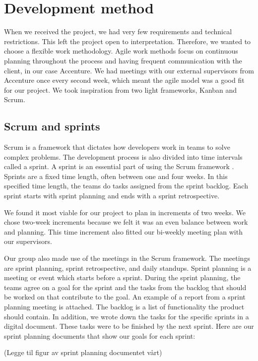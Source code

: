 
\section{Development method}
When we received the project, we had very few requirements and technical restrictions. This left the project open to interpretation. Therefore, we wanted to choose a flexible work methodology. Agile work methods focus on continuous planning throughout the process and having frequent communication with the client, in our case Accenture. We had meetings with our external supervisors from Accenture once every second week, which meant the agile model was a good fit for our project. We took inspiration from two light frameworks, Kanban and Scrum.

\subsection{Scrum and sprints}
Scrum is a framework that dictates how developers work in teams to solve complex problems. The development process is also divided into time intervals called a sprint. A sprint is an essential part of using the Scrum framework \parencite{prosjektveilederen}. Sprints are a fixed time length, often between one and four weeks. In this specified time length, the teams do tasks assigned from the sprint backlog. Each sprint starts with sprint planning and ends with a sprint retrospective.

We found it most viable for our project to plan in increments of two weeks. We chose two-week increments because we felt it was an even balance between work and planning. This time increment also fitted our bi-weekly meeting plan with our supervisors.

Our group also made use of the meetings in the Scrum framework. The meetings are sprint planning, sprint retrospective, and daily standups. Sprint planning is a meeting or event which starts before a sprint. During the sprint planning, the teams agree on a goal for the sprint and the tasks from the backlog that should be worked on that contribute to the goal. An example of a report from a sprint planning meeting is attached. The backlog is a list of functionality the product should contain. In addition, we wrote down the tasks for the specific sprints in a digital document. These tasks were to be finished by the next sprint. Here are our sprint planning documents that show our goals for each sprint:

(Legge til figur av sprint planning documentet vårt)

